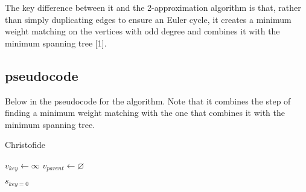 \documentclass{article}
\begin{document}
The key difference between it and the 2-approximation
algorithm is that, rather than simply duplicating edges to ensure an Euler
cycle, it creates a minimum weight matching on the vertices with odd degree and
combines it with the minimum spanning tree [1].

\subsection{pseudocode}
Below in the pseudocode for the algorithm. Note that it combines the step of
finding a minimum weight matching with the one that combines it with the minimum
spanning tree.

\FloatBarrier

\begin{algorithm}
  \caption{Christofide}
  \label{alg1}
  \begin{algorithmic}[1]

      \State $v_{\textit{key}} \gets \infty$
      \State $v_{\textit{parent}} \gets \varnothing$
    \EndFor

    \State $s_{\textit{key} = 0}$


    \EndWhile

    \EndProcedure
  \end{algorithmic}
\end{algorithm}

\FloatBarrier
\end{document}
